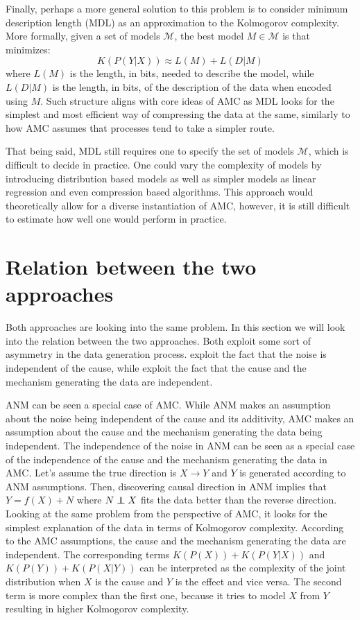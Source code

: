 \documentclass{article}
\newcommand\indep{\protect\mathpalette{\protect\independenT}{\perp}}
\def\independenT#1#2{\mathrel{\rlap{$#1#2$}\mkern2mu{#1#2}}}
\begin{document}
Finally, perhaps a more general solution to this problem is to consider minimum description length (MDL) as an approximation to the Kolmogorov complexity. More formally, given a set of models $\mathcal{M}$, the best model $M\in\mathcal{M}$ is that minimizes:
$$K(P(Y|X))\approx L(M) + L(D|M)$$
where $L(M)$ is the length, in bits, needed to describe the model, while $L(D|M)$ is the length, in bits, of the description of the data when encoded using $M$. Such structure aligns with core ideas of AMC as MDL looks for the simplest and most efficient way of compressing the data at the same, similarly to how AMC assumes that processes tend to take a simpler route.

That being said, MDL still requires one to specify the set of models $\mathcal{M}$, which is difficult to decide in practice. One could vary the complexity of models by introducing distribution based models as well as simpler models as linear regression and even compression based algorithms. This approach would theoretically allow for a diverse instantiation of AMC, however, it is still difficult to estimate how well one would perform in practice.


\section{Relation between the two approaches}
Both approaches are looking into the same problem. In this section we will look into the relation between the two approaches. Both exploit some sort of asymmetry in the data generation process. \cite{peters2011} exploit the fact that the noise is independent of the cause, while \cite{janzing2010} exploit the fact that the cause and the mechanism generating the data are independent.

ANM can be seen a special case of AMC. While ANM makes an assumption about the noise being independent of the cause and its additivity, AMC makes an assumption about the cause and the mechanism generating the data being independent. The independence of the noise in ANM can be seen as a special case of the independence of the cause and the mechanism generating the data in AMC. Let's assume the true direction is $X\to Y$ and $Y$ is generated according to ANM assumptions. Then, discovering causal direction in ANM implies that $Y=f(X)+N$ where $N\indep X$ fits the data better than the reverse direction. Looking at the same problem from the perspective of AMC, it looks for the simplest explanation of the data in terms of Kolmogorov complexity. According to the AMC assumptions, the cause and the mechanism generating the data are independent. The corresponding terms $K(P(X)) + K(P(Y|X))$ and $K(P(Y)) + K(P(X|Y))$ can be interpreted as the complexity of the joint distribution when $X$ is the cause and $Y$ is the effect and vice versa. The second term is more complex than the first one, because it tries to model $X$ from $Y$ resulting in higher Kolmogorov complexity. 
\end{document}
